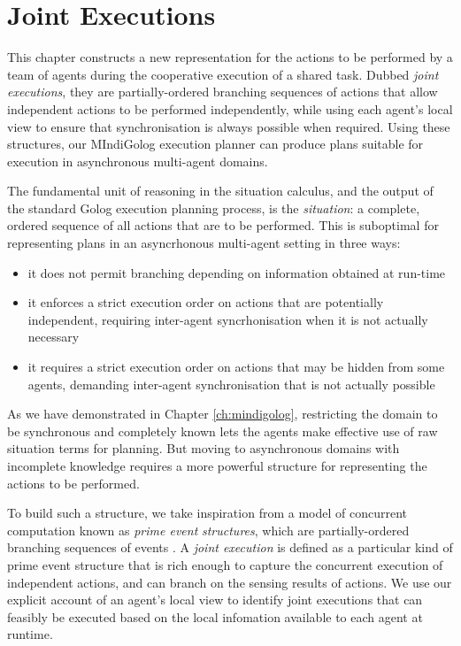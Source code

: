 

\chapter{Joint Executions}

\label{ch:jointexec}

This chapter constructs a new representation for the actions to be
performed by a team of agents during the cooperative execution of
a shared task. Dubbed \emph{joint executions}, they are partially-ordered
branching sequences of actions that allow independent actions to be
performed independently, while using each agent's local view to ensure
that synchronisation is always possible when required. Using these
structures, our MIndiGolog execution planner can produce plans suitable
for execution in asynchronous multi-agent domains.

The fundamental unit of reasoning in the situation calculus, and the
output of the standard Golog execution planning process, is the \emph{situation}:
a complete, ordered sequence of all actions that are to be performed.
This is suboptimal for representing plans in an asyncrhonous multi-agent
setting in three ways:

\begin{itemize}
\item it does not permit branching depending on information obtained at
run-time 
\item it enforces a strict execution order on actions that are potentially
independent, requiring inter-agent syncrhonisation when it is not
actually necessary 
\item it requires a strict execution order on actions that may be hidden
from some agents, demanding inter-agent synchronisation that is not
actually possible 
\end{itemize}
As we have demonstrated in Chapter \ref{ch:mindigolog}, restricting
the domain to be synchronous and completely known lets the agents
make effective use of raw situation terms for planning. But moving
to asynchronous domains with incomplete knowledge requires a more
powerful structure for representing the actions to be performed.

To build such a structure, we take inspiration from a model of concurrent
computation known as \emph{prime event} \emph{structures}, which are
partially-ordered branching sequences of events \citep{npw79event_structures}.
A \emph{joint execution} is defined as a particular kind of prime
event structure that is rich enough to capture the concurrent execution
of independent actions, and can branch on the sensing results of actions.
We use our explicit account of an agent's local view to identify joint
executions that can feasibly be executed based on the local infomation
available to each agent at runtime.

